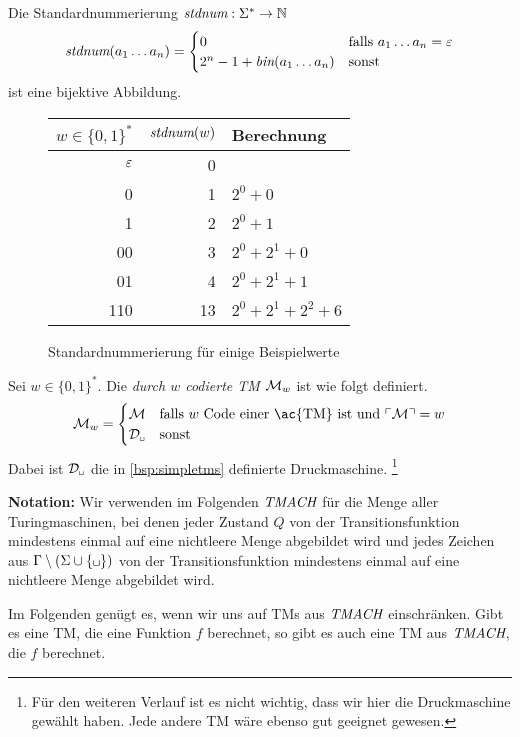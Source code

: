 \begin{lemma}\label{satz:stdnum}
Die Standardnummerierung $\textit{stdnum}: \Sigma^*\rightarrow\mathbb{N}$ 
 $$ \textit{stdnum}(a_1\dots a_n)=\begin{cases}
0 & \text{falls } a_1\dots a_n=\varepsilon\\
2^{n}-1+\textit{bin}(a_1\dots a_n) & \text{sonst}
\end{cases}$$
ist eine bijektive Abbildung.
\end{lemma}


 \begin{figure}[H]\centering
    \begin{tabular}{rr@{\qquad}l}
    $w\in\{0,1\}^*$ & $\textit{stdnum}(w)$ & Berechnung\\ \hline
    $\varepsilon$ & 0 \\
    0 & 1 & $2^0 + 0$\\
    1 & 2 & $2^0 + 1$\\
    00 & 3 & $2^0 + 2^1 + 0$\\
    01 & 4 & $2^0 + 2^1 + 1$\\
    110 & 13 & $2^0 + 2^1 + 2^2 + 6$\\
    \end{tabular}

	\caption{Standardnummerierung für einige Beispielwerte}
\end{figure}


\begin{Def}
 Sei $w\in\{0,1\}^*$.
 Die \emph{durch $w$ codierte \ac{TM}} $\mathcal{M}_w$ ist wie folgt definiert.
 $$\M_w=\begin{cases}
\M & \text{falls } w \text{ Code einer \ac{TM} ist und } \godel{\M}=w\\
\D_\mblank & \text{sonst}
\end{cases}$$
Dabei ist $\D_\mblank$ die in \autoref{bsp:simpletms} definierte Druckmaschine.%
\footnote{Für den weiteren Verlauf ist es nicht wichtig, dass wir hier die Druckmaschine gewählt haben. Jede andere \ac{TM} wäre ebenso gut geeignet gewesen.}
\end{Def}

\textbf{Notation:}
Wir verwenden im Folgenden $\textit{TMACH}$ für die Menge aller Turingmaschinen, bei denen jeder Zustand $Q$ von der Transitionsfunktion mindestens einmal auf eine nichtleere Menge abgebildet wird
und jedes Zeichen aus $\Gamma\setminus(\Sigma\cup\{\mblank\})$ von der Transitionsfunktion mindestens einmal auf eine nichtleere Menge abgebildet wird.

\begin{Bemerkung}
 Im Folgenden genügt es, wenn wir uns auf \ac{TM}s aus $\textit{TMACH}$ einschränken.
 Gibt es eine \ac{TM}, die eine Funktion $f$ berechnet, so gibt es auch eine \ac{TM} aus $\textit{TMACH}$, die $f$ berechnet.
\end{Bemerkung}


